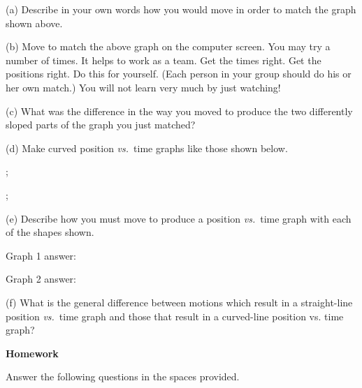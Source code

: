(a) Describe in your own words how you would move in order to match the graph
shown above.
\answerspace{15mm}

(b) Move to match the above graph on the computer screen. You may try a number
of times. It helps to work as a team. Get the times right. Get the positions
right. Do this for yourself. (Each person in your group should do his or her
own match.) You will not learn very much by just watching!

(c) What was the difference in the way you moved to produce the two differently
sloped parts of the graph you just matched?
\answerspace{12mm}

(d) Make curved position \textit{vs.}~time graphs like those shown below.

\begin{center}
\begin{lab_axis}[lab_noticks_1quad,
	height = {1.5in}, width = {2in},
	xlabel={Time},
	ylabel={Position},
	title={Graph 1},
	]
;
\end{lab_axis}
\hspace{0.5in}
\begin{lab_axis}[lab_noticks_1quad,
	height = {1.5in}, width = {2in},
	xlabel={Time},
	ylabel={Position},
	title={Graph 2},
	]
;
\end{lab_axis}
\end{center}


(e) Describe how you must move to produce a position \textit{vs.}~time graph with each
of the shapes shown.

Graph 1 answer:
\answerspace{10mm}

Graph 2 answer:
\answerspace{10mm}

\pagebreak[3]
(f) What is the general difference between motions which result in a straight-line
position \textit{vs.}~time graph and those that result in a curved-line position vs.
time graph?
\answerspace{15mm}

\textbf{Homework} 

Answer the following questions in the spaces provided.

